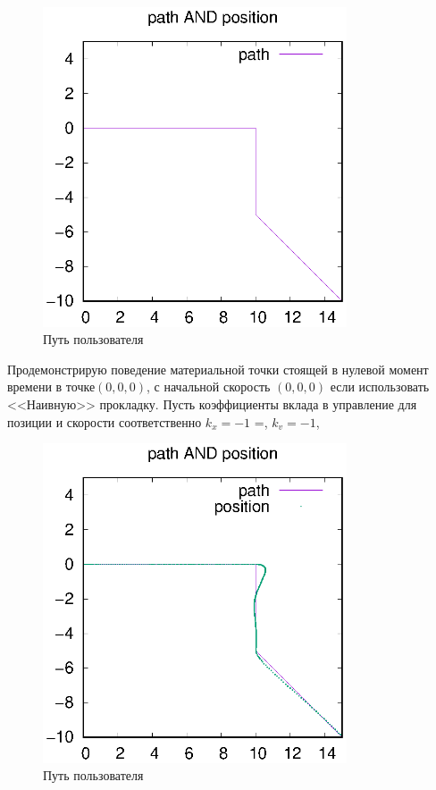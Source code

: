 \documentclass[a4paper,12pt]{article}
\newcounter{def}
\numberwithin{figure}{subsubsection}
\begin{document}
\begin{figure}[ht!]
\centering
\includegraphics[width=90mm]{default_path.eps}
\caption{ Путь пользователя}\label{user_path}
\end{figure}

Продемонстрирую поведение материальной точки стоящей в нулевой момент времени в точке$(0,0,0)$, с начальной скорость $(0,0,0)$ если использовать <<Наивную>> прокладку. Пусть коэффициенты вклада в управление для позиции и скорости соответственно $k_x = -1$ =,  $k_v = -1$, 

\begin{figure}[p]
\centering
\includegraphics[width=90mm]{default_path_not_procladka.eps}
\caption{ Путь пользователя}\label{not-prokladka}
\end{figure}
\end{document}
